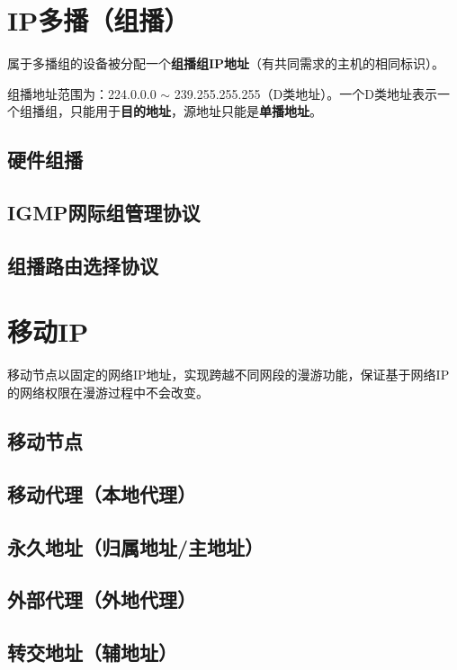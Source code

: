 \section{IP多播（组播）}
属于多播组的设备被分配一个\textbf{组播组IP地址}（有共同需求的主机的相同标识）。

组播地址范围为：224.0.0.0 \(\sim\) 239.255.255.255（D类地址）。一个D类地址表示一个组播组，只能用于\textbf{目的地址}，源地址只能是\textbf{单播地址}。

\subsection{硬件组播}


\subsection{IGMP网际组管理协议}


\subsection{组播路由选择协议}


\section{移动IP}
移动节点以固定的网络IP地址，实现跨越不同网段的漫游功能，保证基于网络IP的网络权限在漫游过程中不会改变。

\subsection{移动节点}


\subsection{移动代理（本地代理）}


\subsection{永久地址（归属地址/主地址）}


\subsection{外部代理（外地代理）}


\subsection{转交地址（辅地址）}


